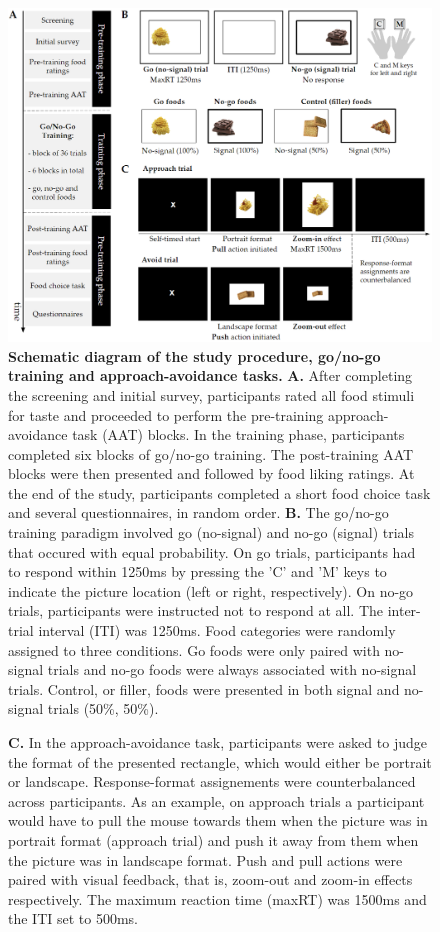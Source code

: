 \documentclass[man,floatsintext]{apa6}
\begin{document}
\begin{figure} [!htb]
\centering
\includegraphics[width=\linewidth]{figures/Figure1.png}
\caption{\textbf{Schematic diagram of the study procedure, go/no-go training and approach-avoidance tasks.} \textbf{A.} After completing the screening and initial survey, participants rated all food stimuli for taste and proceeded to perform the pre-training approach-avoidance task (AAT) blocks. In the training phase, participants completed six blocks of go/no-go training. The post-training AAT blocks were then presented and followed by food liking ratings. At the end of the study, participants completed a short food choice task and several questionnaires, in random order. \textbf{B.} The go/no-go training paradigm involved go (no-signal) and no-go (signal) trials that occured with equal probability. On go trials, participants had to respond within 1250ms by pressing the 'C' and 'M' keys to indicate the picture location (left or right, respectively). On no-go trials, participants were instructed not to respond at all. The inter-trial interval (ITI) was 1250ms. Food categories were randomly assigned to three conditions. Go foods were only paired with no-signal trials and no-go foods were always associated with no-signal trials. Control, or filler, foods were presented in both signal and no-signal trials (50\%, 50\%).}
\label{fig:procedure}
\end{figure}
\clearpage
\begin{figure}
    \ContinuedFloat
    \captionsetup{labelformat=empty}
    \caption{\textbf{C.} In the approach-avoidance task, participants were asked to judge the format of the presented rectangle, which would either be portrait or landscape. Response-format assignements were counterbalanced across participants. As an example, on approach trials a participant would have to pull the mouse towards them when the picture was in portrait format (approach trial) and push it away from them when the picture was in landscape format. Push and pull actions were paired with visual feedback, that is, zoom-out and zoom-in effects respectively. The maximum reaction time (maxRT) was 1500ms and the ITI set to 500ms.}
\end{figure}
\end{document}
